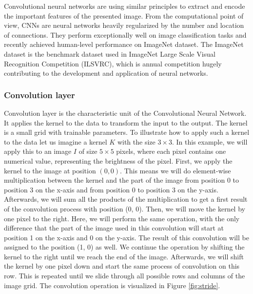 Convolutional neural networks are using similar principles to extract and encode the important features of the presented image.
From the computational point of view, CNNs are neural networks heavily regularized by the number and location of connections.
They perform exceptionally well on image classification tasks and recently achieved human-level performance on ImageNet dataset.
The ImageNet dataset is the benchmark dataset used in ImageNet Large Scale Visual Recognition Competition (ILSVRC), which is annual competition hugely contributing to the development and application of neural networks.

\subsubsection{Convolution layer}
Convolution layer is the characteristic unit of the Convolutional Neural Network.
It applies the kernel to the data to transform the input to the output.
The kernel is a small grid with trainable parameters.
To illustrate how to apply such a kernel to the data let us imagine a kernel $K$ with the size $3 \times 3$.
In this example, we will apply this to an image $I$ of size $5 \times 5$ pixels, where each pixel contains one numerical value, representing the brightness of the pixel.
First, we apply the kernel to the image at position $(0, 0)$.
This means we will do element-wise multiplication between the kernel and the part of the image from position 0 to position 3 on the x-axis and from position 0 to position 3 on the y-axis.
Afterwards, we will sum all the products of the multiplication to get a first result of the convolution process with position (0, 0).
Then, we will move the kernel by one pixel to the right.
Here, we will perform the same operation, with the only difference that the part of the image used in this convolution will start at position 1 on the x-axis and 0 on the y-axis.
The result of this convolution will be assigned to the position (1, 0) as well.
We continue the operation by shifting the kernel to the right until we reach the end of the image.
Afterwards, we will shift the kernel by one pixel down and start the same process of convolution on this row.
This is repeated until we slide through all possible rows and columns of the image grid.
The convolution operation is visualized in Figure \ref{fig:stride}.



